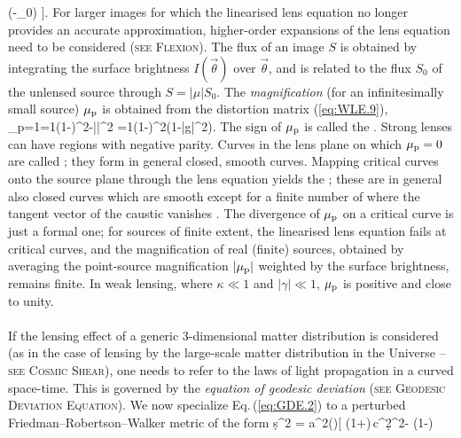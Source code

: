 {    \cdot(\vec\theta-\vec\theta_0)
  \right]\;.
\label{eq:WLE.19}
\ee
%
For larger images for which the linearised lens equation no longer
provides an accurate approximation, higher-order expansions of the
lens equation need to be considered ({\scshape{\footnotesize see}
  \gls{Flexion}}). The flux of an image $S$ is obtained by integrating the
surface brightness $I(\vec\theta)$ over $\vec\theta$, and is related
to the flux $S_0$ of the unlensed source through $S=|\mu|S_0$. The
{\it magnification} (for an infinitesimally small
source) $\mu_{\rm p}$ is 
obtained from the distortion matrix 
(\ref{eq:WLE.9}), 
%
\be
\mu_{\rm p}={1\over {}}={1\over (1-\kappa)^2-|\gamma|^2}
={1\over (1-\kappa)^2(1-|g|^2)}\;.
\label{eq:WLE.20}
\ee
%
The sign of $\mu_{\rm p}$ is called the . Strong lenses can have regions with
negative parity. Curves in the lens plane on which $\mu_{\rm p}=0$ are
called ; they form in
general closed, smooth curves. Mapping critical curves onto the source
plane through the lens equation yields the ; these are in general also closed curves which are smooth
except for a finite number of  where the
tangent vector of the caustic vanishes . The divergence of $\mu_{\rm
p}$ on a critical curve is just a formal one; for sources of finite
extent, the linearised lens equation fails at critical curves, and the
magnification of real (finite) sources, obtained by averaging the
point-source magnification $|\mu_{\rm p}|$ weighted by the surface
brightness, remains finite. In weak lensing, where $\kappa\ll 1$ and
$|\gamma|\ll 1$, $\mu_{\rm p}$ is positive and close to unity.
\\
\\
If the lensing effect of a generic 3-dimensional matter distribution is
considered (as in the case of lensing by the large-scale matter
distribution in the Universe -- {\scshape{\footnotesize see} \gls{Cosmic
  Shear}}), one needs to refer to the laws of light propagation in a
curved space-time. This is governed by the {\it equation of geodesic
deviation} ({\scshape{\footnotesize see} \gls{Geodesic Deviation Equation}}).
We now specialize Eq.\,(\ref{eq:GDE.2}) to a
perturbed Friedman--Robertson--Walker metric of the form
%
\be
  \d s^2 = a^2(\tau)\left[
    \left(1+\right)\,c^2\d\tau^2-
    \left(1-\right)
}
